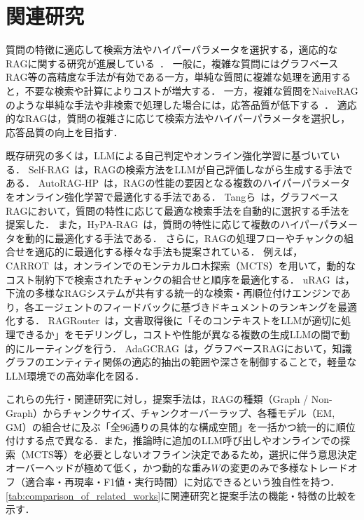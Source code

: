 \section{関連研究} \label{sec2}
質問の特徴に適応して検索方法やハイパーパラメータを選択する，適応的なRAGに関する研究が進展している~\cite{Asai23,fu24,Tang25,Rishi25,Jeong24}．
一般に，複雑な質問にはグラフベースRAG等の高精度な手法が有効である一方，単純な質問に複雑な処理を適用すると，不要な検索や計算によりコストが増大する．
一方，複雑な質問をNaiveRAGのような単純な手法や非検索で処理した場合には，応答品質が低下する~\cite{Jeong24}． 
適応的なRAGは，質問の複雑さに応じて検索方法やハイパーパラメータを選択し，応答品質の向上を目指す．

既存研究の多くは，LLMによる自己判定やオンライン強化学習に基づいている．
Self-RAG~\cite{Asai23}は，RAGの検索方法をLLMが自己評価しながら生成する手法である．
AutoRAG-HP~\cite{fu24}は，RAGの性能の要因となる複数のハイパーパラメータをオンライン強化学習で最適化する手法である．
Tangら~\cite{Tang25}は，グラフベースRAGにおいて，質問の特性に応じて最適な検索手法を自動的に選択する手法を提案した．
また，HyPA-RAG~\cite{Rishi25}は，質問の特性に応じて複数のハイパーパラメータを動的に最適化する手法である．
さらに，RAGの処理フローやチャンクの組合せを適応的に最適化する様々な手法も提案されている．
例えば，CARROT~\cite{wang2026carrot}は，オンラインでのモンテカルロ木探索（MCTS）を用いて，動的なコスト制約下で検索されたチャンクの組合せと順序を最適化する．
uRAG~\cite{salemi2024urag}は，下流の多様なRAGシステムが共有する統一的な検索・再順位付けエンジンであり，各エージェントのフィードバックに基づきドキュメントのランキングを最適化する．
RAGRouter~\cite{zhang2025ragrouter}は，文書取得後に「そのコンテキストをLLMが適切に処理できるか」をモデリングし，コストや性能が異なる複数の生成LLMの間で動的にルーティングを行う．
AdaGCRAG~\cite{zhang2025adagcrag}は，グラフベースRAGにおいて，知識グラフのエンティティ関係の適応的抽出の範囲や深さを制御することで，軽量なLLM環境での高効率化を図る．

これらの先行・関連研究に対し，提案手法は，RAGの種類（Graph / Non-Graph）からチャンクサイズ、チャンクオーバーラップ、各種モデル（EM, GM）の組合せに及ぶ「全96通りの具体的な構成空間」を一括かつ統一的に順位付けする点で異なる．また，推論時に追加のLLM呼び出しやオンラインでの探索（MCTS等）を必要としないオフライン決定であるため，選択に伴う意思決定オーバーヘッドが極めて低く，かつ動的な重み$W$の変更のみで多様なトレードオフ（適合率・再現率・F1値・実行時間）に対応できるという独自性を持つ．
\ref{tab:comparison_of_related_works}に関連研究と提案手法の機能・特徴の比較を示す．


